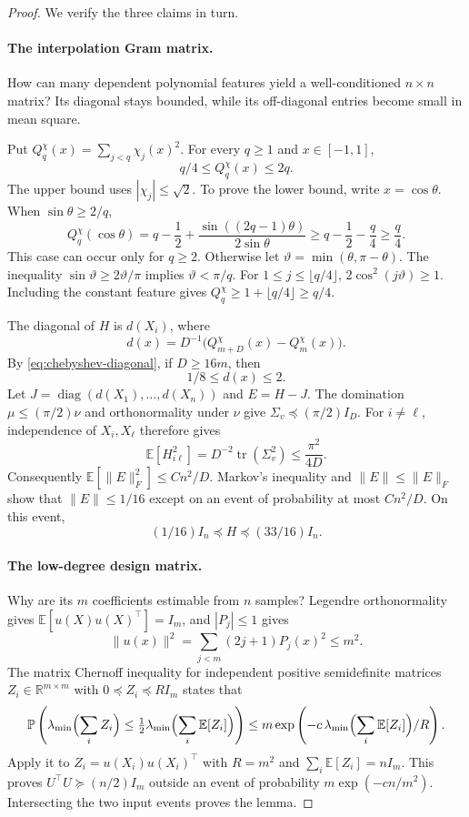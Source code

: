 \documentclass[11pt,twoside]{article}
\newcommand{\E}{\mathbb E}
\renewcommand{\P}{\mathbb P}
\newcommand{\R}{\mathbb R}
\theoremstyle{definition}
\theoremstyle{remark}
\begin{document}
\begin{proof}
We verify the three claims in turn.

\paragraph{The interpolation Gram matrix.}
How can many dependent polynomial features yield a well-conditioned
$n\times n$ matrix? Its diagonal stays bounded, while its off-diagonal
entries become small in mean square.

Put $Q_q^\chi(x)=\sum_{j<q}\chi_j(x)^2$.
For every $q\ge1$ and $x\in[-1,1]$,
\begin{equation}
 q/4\le Q_q^\chi(x)\le2q.
 \label{eq:chebyshev-diagonal}
\end{equation}
The upper bound uses $|\chi_j|\le\sqrt2$. To prove the lower bound, write
$x=\cos\theta$. When $\sin\theta\ge2/q$,
\[
 Q_q^\chi(\cos\theta)
 =q-\frac12+\frac{\sin((2q-1)\theta)}{2\sin\theta}
 \ge q-\frac12-\frac q4\ge\frac q4.
\]
This case can occur only for $q\ge2$.
Otherwise let $\vartheta=\min(\theta,\pi-\theta)$. The inequality
$\sin\vartheta\ge2\vartheta/\pi$ implies $\vartheta<\pi/q$.
For $1\le j\le\lfloor q/4\rfloor$,
$2\cos^2(j\vartheta)\ge1$. Including the constant feature gives
$Q_q^\chi\ge1+\lfloor q/4\rfloor\ge q/4$.

The diagonal of $H$ is $d(X_i)$, where
\[
 d(x)=D^{-1}\bigl(Q_{m+D}^\chi(x)-Q_m^\chi(x)\bigr).
\]
By \cref{eq:chebyshev-diagonal}, if $D\ge16m$, then
\[
 1/8\le d(x)\le2.
\]
Let $J=\operatorname{diag}(d(X_1),\ldots,d(X_n))$ and $E=H-J$.
The domination $\mu\le(\pi/2)\nu$ and orthonormality under $\nu$ give
$\Sigma_v\preceq(\pi/2)I_D$. For $i\ne\ell$, independence of $X_i,X_\ell$
therefore gives
\[
 \E[H_{i\ell}^2]
 =D^{-2}\operatorname{tr}(\Sigma_v^2)
 \le\frac{\pi^2}{4D}.
\]
Consequently $\E[\|E\|_F^2]\le Cn^2/D$.
Markov's inequality and $\|E\|\le\|E\|_F$ show that
$\|E\|\le1/16$ except on an event of probability at most $Cn^2/D$.
On this event,
\[
 (1/16)I_n\preceq H\preceq(33/16)I_n.
\]

\paragraph{The low-degree design matrix.}
Why are its $m$ coefficients estimable from $n$ samples?
Legendre orthonormality gives $\E[u(X)u(X)^\top]=I_m$, and $|P_j|\le1$
gives
\[
 \|u(x)\|^2=\sum_{j<m}(2j+1)P_j(x)^2\le m^2.
\]
The matrix Chernoff inequality for independent positive semidefinite matrices
$Z_i\in\R^{m\times m}$ with $0\preceq Z_i\preceq RI_m$ states that
\[
 \P\left(\lambda_{\min}\Bigl(\sum_iZ_i\Bigr)
          \le\tfrac12\lambda_{\min}\Bigl(\sum_i\E[Z_i]\Bigr)\right)
 \le m\exp\left(-c\,\lambda_{\min}\Bigl(\sum_i\E[Z_i]\Bigr)/R\right).
\]
Apply it to $Z_i=u(X_i)u(X_i)^\top$ with $R=m^2$ and
$\sum_i\E[Z_i]=nI_m$. This proves
$U^\top U\succeq(n/2)I_m$ outside an event of probability
$m\exp(-cn/m^2)$. Intersecting the two input events proves the lemma.
\end{proof}
\end{document}
